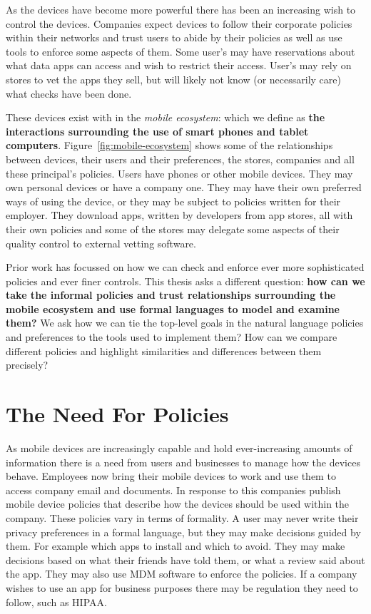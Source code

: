 \documentclass[thesis.tex]{subfiles}
\begin{document}
As the devices have become more powerful there has been an increasing wish to
control the devices. Companies expect devices to follow their corporate policies
within their networks and trust users to abide by their policies as well as use
tools to enforce some aspects of them. Some user's may have reservations about
what data apps can access and wish to restrict their access. User's may rely on
stores to vet the apps they sell, but will likely not know (or necessarily care)
what checks have been done.

These devices exist with in the \emph{mobile ecosystem}: which we define as
\textbf{the interactions surrounding the use of smart phones and tablet
computers}. Figure~\ref{fig:mobile-ecosystem} shows some of the relationships
between devices, their users and their preferences, the stores, companies and
all these principal's policies. Users have phones or other mobile devices. They
may own personal devices or have a company one. They may have their own
preferred ways of using the device, or they may be subject to policies written
for their employer. They download apps, written by developers from app stores,
all with their own policies and some of the stores may delegate some aspects of
their quality control to external vetting software.

Prior work has focussed on how we can check and enforce ever more sophisticated
policies and ever finer controls. This thesis asks a different question:
\textbf{how can we take the informal policies and trust relationships
surrounding the mobile ecosystem and use formal languages to model and examine
them?} We ask how we can tie the top-level goals in the natural language
policies and preferences to the tools used to implement them? How can we compare
different policies and highlight similarities and differences between them
precisely?

\section{The Need For Policies}

As mobile devices are increasingly capable and hold
ever-increasing amounts of information there is a need from users and
businesses to manage how the devices behave.  Employees now bring
their mobile devices to work and use them to access company email and
documents.  In response to this companies publish mobile device
policies that describe how the devices should be used within the
company.  These policies vary in terms of formality.  A user may never
write their privacy preferences in a formal language, but they may
make decisions guided by them.  For example which apps to install and
which to avoid.  They may make decisions based on what their friends
have told them, or what a review said about the app.  They may also
use \ac{MDM} software to enforce the policies.  If a company wishes to
use an app for business purposes there may be regulation they need to
follow, such as \ac{HIPAA}.
\end{document}
